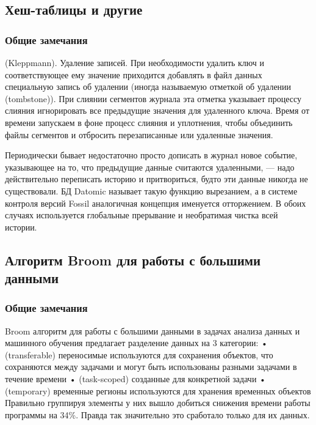 \subsection{Хеш-таблицы и другие}

\subsubsection{Общие замечания}

(Kleppmann). Удаление записей. При необходимости удалить ключ и соответствующее ему значение
приходится добавлять в файл данных специальную запись об удалении
(иногда называемую отметкой об удалении (tombstone)). При слиянии сегментов журнала эта отметка
указывает процессу слияния игнорировать все предыдущие значения для удаленного ключа.
Время от времени запускаем в фоне процесс слияния и уплотнения, чтобы объединить файлы сегментов
и отбросить перезаписанные или удаленные значения.

Периодически бывает недостаточно просто дописать в журнал новое событие, указывающее на то,
что предыдущие данные считаются удаленными, — надо действительно переписать историю и притвориться,
будто эти данные никогда не существовали. БД Datomic называет такую функцию вырезанием,
а в системе контроля версий Fossil аналогичная концепция именуется отторжением.
В обоих случаях используется глобальные прерывание и необратимая чистка всей истории.

\subsection{Алгоритм Broom для работы с большими данными}

\subsubsection{Общие замечания}

Broom алгоритм для работы с большими данными в задачах анализа данных и машинного обучения
предлагает разделение данных на 3 категории: 
    • (transferable) переносимые используются для сохранения объектов, что сохраняются
    между задачами и могут быть использованы разными задачами в течение времени
    • (task-scoped) созданные для конкретной задачи
    • (temporary) временные регионы используются для хранения временных объектов
Правильно группируя элементы у них вышло добиться снижения времени работы программы на 34\%.
Правда так значительно это сработало только для их данных.

